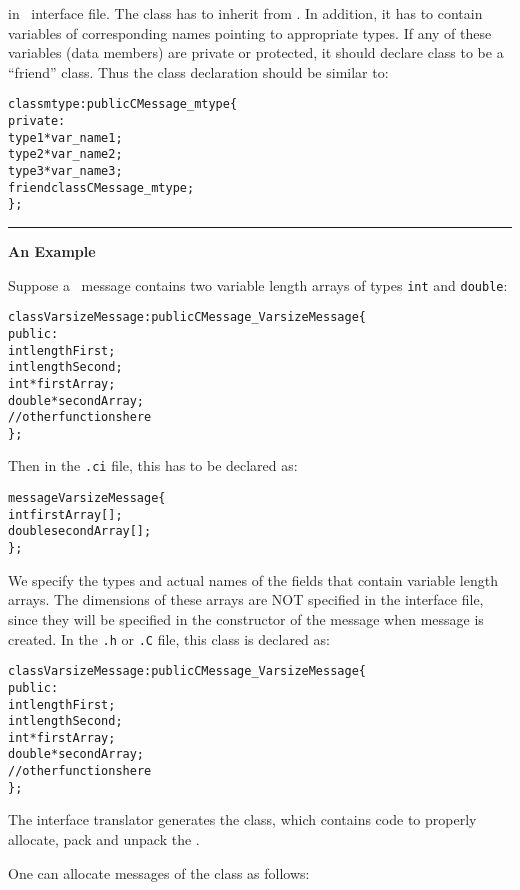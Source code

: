 in \charmpp\ interface file. The class  has to inherit from
. In addition, it has to contain variables of corresponding
names pointing to appropriate types. If any of these variables (data members)
are private or protected, it should declare class  to be a
``friend'' class. Thus the  class declaration should be similar to:

\begin{alltt}
class mtype : public CMessage_mtype \{
 private:
   type1 *var_name1;
   type2 *var_name2;
   type3 *var_name3;
   friend class CMessage_mtype;
\};
\end{alltt}

\small
\hrule

\noindent\textbf{An Example}

Suppose a \charmpp\ message contains two variable length arrays of types
\texttt{int} and \texttt{double}:

\begin{alltt} 
class VarsizeMessage: public CMessage_VarsizeMessage \{
  public:
    int lengthFirst;
    int lengthSecond;
    int* firstArray;
    double* secondArray;
    // other functions here
\};
\end{alltt}

Then in the \texttt{.ci} file, this has to be declared as: 

\begin{alltt}
message VarsizeMessage \{
  int firstArray[];
  double secondArray[];
\};
\end{alltt}

We specify the types and actual names of the fields that
contain variable length arrays. The dimensions of these arrays are NOT
specified in the interface file, since they will be specified in the
constructor of the message when message is created. In the {\tt .h} or {\tt .C}
file, this class is declared as:

\begin{alltt} 

class VarsizeMessage : public CMessage_VarsizeMessage \{ 
  public: 
    int lengthFirst;
    int lengthSecond;
    int* firstArray;
    double* secondArray;
    // other functions here
\};
\end{alltt}

The interface translator generates the  class,
which contains code to properly allocate, pack and unpack the
.


One can allocate messages of the  class as follows:

